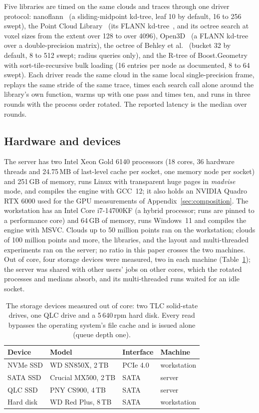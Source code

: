 Five libraries are timed on the same clouds and traces through one driver protocol: nanoflann~\cite{blanco2014nanoflann} (a sliding-midpoint kd-tree, leaf 10 by default, 16 to 256 swept), the Point Cloud Library~\cite{rusu2011pcl} (its FLANN kd-tree~\cite{muja2009flann}, and its octree search at voxel sizes from the extent over 128 to over 4096), Open3D~\cite{zhou2018open3d} (a FLANN kd-tree over a double-precision matrix), the octree of Behley et al.~\cite{behley2015octree} (bucket 32 by default, 8 to 512 swept; radius queries only), and the R-tree of Boost.Geometry~\cite{boost_geometry} with sort-tile-recursive bulk loading (16 entries per node as documented, 8 to 64 swept). Each driver reads the same cloud in the same local single-precision frame, replays the same stride of the same trace, times each search call alone around the library's own function, warms up with one pass and times ten, and runs in three rounds with the process order rotated. The reported latency is the median over rounds.

\subsection{Hardware and devices}\label{sec:hardware}

The server has two Intel Xeon Gold 6140 processors (18 cores, 36 hardware threads and 24.75\,MB of last-level cache per socket, one memory node per socket) and 251\,GB of memory, runs Linux with transparent huge pages in \emph{madvise} mode, and compiles the engine with GCC~12; it also holds an NVIDIA Quadro RTX 6000 used for the GPU measurements of Appendix~\ref{sec:composition}. The workstation has an Intel Core i7-14700KF (a hybrid processor; runs are pinned to a performance core) and 64\,GB of memory, runs Windows~11 and compiles the engine with MSVC. Clouds up to 50 million points ran on the workstation; clouds of 100 million points and more, the libraries, and the layout and multi-threaded experiments ran on the server; no ratio in this paper crosses the two machines. Out of core, four storage devices were measured, two in each machine (Table~\ref{tab:devices}); the server was shared with other users' jobs on other cores, which the rotated processes and medians absorb, and its multi-threaded runs waited for an idle socket.

\begin{table}[t]
\centering\footnotesize
\caption{The storage devices measured out of core: two TLC solid-state drives, one QLC drive and a 5\,640\,rpm hard disk. Every read bypasses the operating system's file cache and is issued alone (queue depth one).}
\label{tab:devices}
\setlength{\tabcolsep}{4pt}
\begin{tabular}{llll}
\toprule
Device & Model & Interface & Machine \\
\midrule
NVMe SSD & WD SN850X, 2\,TB & PCIe 4.0 & workstation \\
SATA SSD & Crucial MX500, 2\,TB & SATA & server \\
QLC SSD & PNY CS900, 4\,TB & SATA & server \\
Hard disk & WD Red Plus, 8\,TB & SATA & workstation \\
\bottomrule
\end{tabular}
\end{table}
